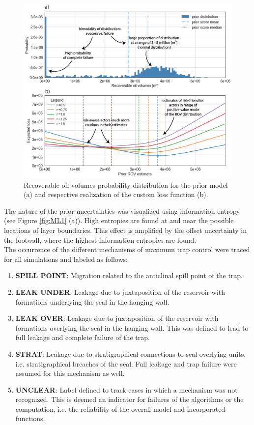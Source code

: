 		\begin{figure}[h]
			\centering
			\includegraphics[width=1\textwidth]{Figures/M_prior}
			\caption{Recoverable oil volumes probability distribution for the prior model (a) and respective realization of the custom loss function (b).}\label{fig:M_prior}
		\end{figure}
		The nature of the prior uncertainties was visualized using information entropy (see Figure \ref{fig:ML1} (a)). High entropies are found at and near the possible locations of layer boundaries. This effect is amplified by the offset uncertainty in the footwall, where the highest information entropies are found.\\
		The occurrence of the different mechanisms of maximum trap control were traced for all simulations and labeled as follows:
		\begin{enumerate}
		\item \textbf{SPILL POINT}: Migration related to the anticlinal spill point of the trap.
		\item \textbf{LEAK UNDER}: Leakage due to juxtaposition of the reservoir with formations underlying the seal in the hanging wall.
		\item \textbf{LEAK OVER}: Leakage due to juxtaposition of the reservoir with formations overlying the seal in the hanging wall. This was defined to lead to full leakage and complete failure of the trap.
		\item \textbf{STRAT}: Leakage due to stratigraphical connections to seal-overlying units, i.e. stratigraphical breaches of the seal. Full leakage and trap failure were assumed for this mechanism as well.
		\item \textbf{UNCLEAR}: Label defined to track cases in which a mechanism was not recognized. This is deemed an indicator for failures of the algorithms or the computation, i.e. the reliability of the overall model and incorporated functions. 
		\end{enumerate}
